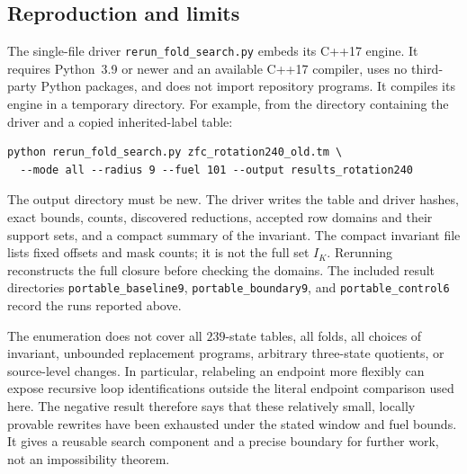 \subsection{Reproduction and limits}

The single-file driver \texttt{rerun\_fold\_search.py} embeds its C++17
engine.  It requires Python~3.9 or newer and an available C++17 compiler,
uses no third-party Python packages, and does not import repository
programs.  It compiles its engine in a temporary directory.  For example,
from the directory containing the driver and a copied inherited-label
table:
\begin{verbatim}
python rerun_fold_search.py zfc_rotation240_old.tm \
  --mode all --radius 9 --fuel 101 --output results_rotation240
\end{verbatim}
The output directory must be new.  The driver writes the table and
driver hashes, exact bounds, counts, discovered reductions, accepted
row domains and their support sets, and a compact summary of the
invariant.  The compact invariant file lists fixed offsets and mask
counts; it is not the full set $I_K$.  Rerunning reconstructs the full
closure before checking the domains.  The included result directories
\texttt{portable\_baseline9}, \texttt{portable\_boundary9}, and
\texttt{portable\_control6} record the runs reported above.

The enumeration does not cover all $239$-state tables, all folds,
all choices of invariant, unbounded replacement programs, arbitrary
three-state quotients, or source-level changes.  In particular,
relabeling an endpoint more flexibly can expose recursive loop
identifications outside the literal endpoint comparison used here.
The negative result therefore says that these relatively small,
locally provable rewrites have been exhausted under the stated
window and fuel bounds.  It gives a reusable search component and
a precise boundary for further work, not an impossibility theorem.
